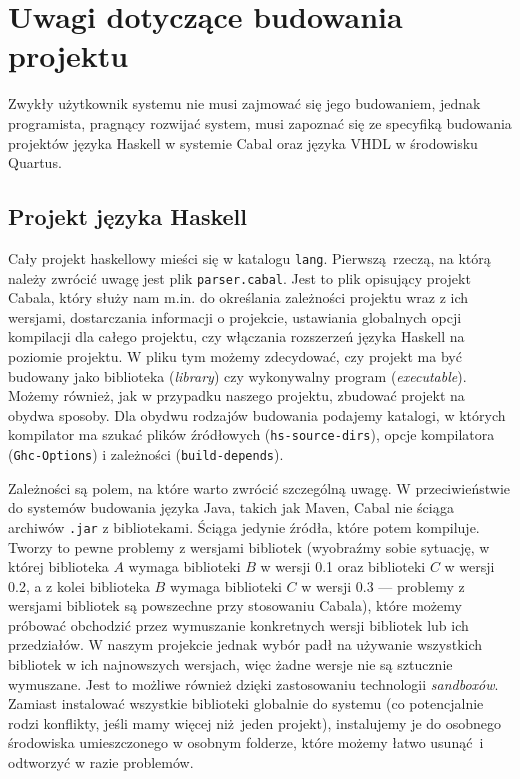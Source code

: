 \section{Uwagi dotyczące budowania projektu}

Zwykły użytkownik systemu nie musi zajmować się jego budowaniem, jednak programista, pragnący rozwijać system, musi zapoznać się ze specyfiką budowania projektów języka Haskell w systemie Cabal oraz języka VHDL w środowisku Quartus.

\subsection{Projekt języka Haskell}
Cały projekt haskellowy mieści się w katalogu \texttt{lang}. Pierwszą rzeczą, na którą należy zwrócić uwagę jest plik \texttt{parser.cabal}. Jest to plik opisujący projekt Cabala, który służy nam m.in. do określania zależności projektu wraz z ich wersjami, dostarczania informacji o projekcie, ustawiania globalnych opcji kompilacji dla całego projektu, czy włączania rozszerzeń języka Haskell na poziomie projektu. W pliku tym możemy zdecydować, czy projekt ma być budowany jako biblioteka (\textit{library}) czy wykonywalny program (\textit{executable}). Możemy również, jak w przypadku naszego projektu, zbudować projekt na obydwa sposoby. Dla obydwu rodzajów budowania podajemy katalogi, w których kompilator ma szukać plików źródłowych (\texttt{hs-source-dirs}), opcje kompilatora (\texttt{Ghc-Options}) i zależności (\texttt{build-depends}).

Zależności są polem, na które warto zwrócić szczególną uwagę. W przeciwieństwie do systemów budowania języka Java, takich jak Maven, Cabal nie ściąga archiwów \texttt{.jar} z bibliotekami. Ściąga jedynie źródła, które potem kompiluje. Tworzy to pewne problemy z wersjami bibliotek (wyobraźmy sobie sytuację, w której biblioteka $A$ wymaga biblioteki $B$ w wersji 0.1 oraz biblioteki $C$ w wersji 0.2, a z kolei biblioteka $B$ wymaga biblioteki $C$ w wersji 0.3 --- problemy z wersjami bibliotek są powszechne przy stosowaniu Cabala), które możemy próbować obchodzić przez wymuszanie konkretnych wersji bibliotek lub ich przedziałów. W naszym projekcie jednak wybór padł na używanie wszystkich bibliotek w ich najnowszych wersjach, więc żadne wersje nie są sztucznie wymuszane. Jest to możliwe również dzięki zastosowaniu technologii \textit{sandboxów}. Zamiast instalować wszystkie biblioteki globalnie do systemu (co potencjalnie rodzi konflikty, jeśli mamy więcej niż jeden projekt), instalujemy je do osobnego środowiska umieszczonego w osobnym folderze, które możemy łatwo usunąć i odtworzyć w razie problemów.

